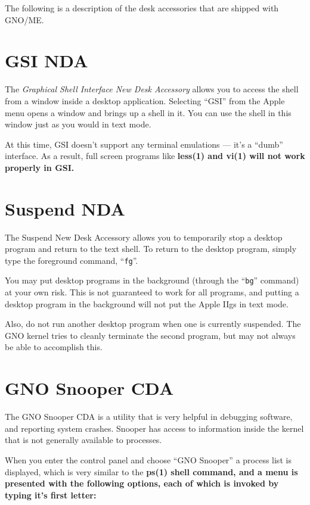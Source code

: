 \documentclass{report}
\begin{document}
The following is a description of the desk
accessories that are shipped with GNO/ME.

\section{GSI NDA}

The \textit{Graphical Shell Interface New Desk Accessory}
allows you to access the shell from a window inside a
desktop application. Selecting ``GSI'' from the Apple menu opens a
window and brings up a shell in it. You can use the shell in this
window just as you would in text mode.

At this time, GSI doesn't support any
terminal emulations --- it's a ``dumb'' interface. As a result,
full screen programs like \bf less\rm(1) and \bf vi\rm(1) will not
work properly in GSI.

\section{Suspend NDA}

The Suspend New Desk Accessory allows you
to temporarily stop a desktop program and return to the text
shell. To return to the desktop program, simply type the foreground
command, ``\texttt{fg}''.

You may put desktop programs in the background
(through the ``\texttt{bg}'' command) 
at your own risk. This is not guaranteed to work for all programs,
and putting a desktop program in the background will not put the
Apple IIgs in text mode.

Also, do not run another desktop program
when one is currently suspended. The GNO kernel tries to cleanly
terminate the second program, but may not always be able to
accomplish this.

\section{GNO Snooper CDA}

The GNO Snooper CDA is a utility that is
very helpful in debugging software, and reporting system crashes.
Snooper has access to information inside the kernel that is not
generally available to processes.

When you enter the control panel and choose
``GNO Snooper'' a process list is displayed, which is
very similar to the \bf ps\rm(1) shell command, and a menu is presented
with the following options, each of which is invoked by typing it's
first letter:
\end{document}
